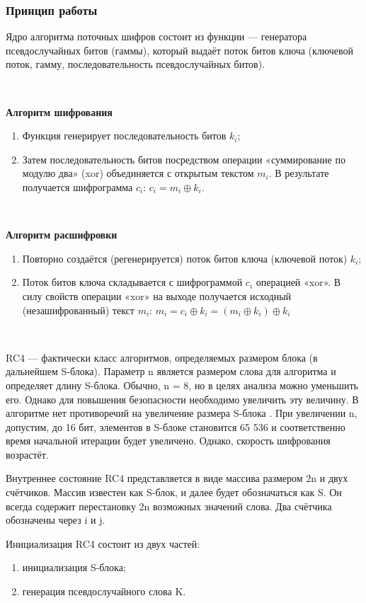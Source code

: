 \documentclass[a4paper]{report}
\begin{document}
\subsubsection{Принцип работы} 
Ядро алгоритма поточных шифров состоит из функции — генератора псевдослучайных битов (гаммы), который выдаёт поток битов ключа (ключевой поток, гамму, последовательность псевдослучайных битов).

~

\textbf{Алгоритм шифрования}
\begin{enumerate}
\item Функция генерирует последовательность битов $k_{i}$;
\item Затем последовательность битов посредством операции «суммирование по модулю два» (xor) объединяется с открытым текстом $m_{i}$. В результате получается шифрограмма $c_{i}$: $c_{i}=m_{i}\oplus k_{i}$.
\end{enumerate}

~

\textbf{Алгоритм расшифровки}
\begin{enumerate}
\item Повторно создаётся (регенерируется) поток битов ключа (ключевой поток) $k_{i}$;
\item Поток битов ключа складывается с шифрограммой $c_{i}$ операцией «xor». В силу свойств операции «xor» на выходе получается исходный (незашифрованный) текст $m_{i}$:
$m_{i}=c_{i}\oplus k_{i}=(m_{i}\oplus k_{i})\oplus k_{i}$
\end{enumerate}

~

RC4 — фактически класс алгоритмов, определяемых размером блока (в дальнейшем S-блока). Параметр n является размером слова для алгоритма и определяет длину S-блока. Обычно, n = 8, но в целях анализа можно уменьшить его. Однако для повышения безопасности необходимо увеличить эту величину. В алгоритме нет противоречий на увеличение размера S-блока . При увеличении n, допустим, до 16 бит, элементов в S-блоке становится 65 536 и соответственно время начальной итерации будет увеличено. Однако, скорость шифрования возрастёт.

Внутреннее состояние RC4 представляется в виде массива размером 2n и двух счётчиков. Массив известен как S-блок, и далее будет обозначаться как S. Он всегда содержит перестановку 2n возможных значений слова. Два счётчика обозначены через i и j.

Инициализация RC4 состоит из двух частей:
\begin{enumerate}
\item инициализация S-блока;
\item генерация псевдослучайного слова K.
\end{enumerate}
\end{document}
